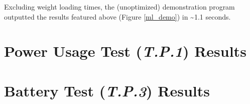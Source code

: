 \documentclass[10pt,letterpaper]{article}
\begin{document}
Excluding weight loading times, the (unoptimized) demonstration program outputted the results featured above (Figure \ref{ml_demo}) in \textasciitilde 1.1 seconds.
 
 \section{Power Usage Test (\textit{T.P.1}) Results}\label{appendix:T.P.1}
 
 \section{Battery Test (\textit{T.P.3}) Results}\label{appendix:T.P.3}
 

\end{document}
